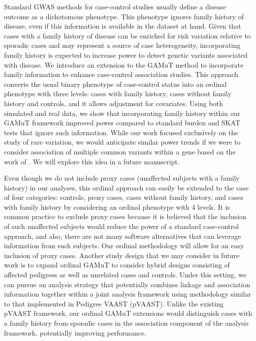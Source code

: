\documentclass[]{article}
\begin{document}
Standard GWAS methods for case-control studies usually define a disease outcome as a dichotomous phenotype. This phenotype ignores family history of disease, even if this information is available in the dataset at hand. Given that cases with a family history of disease can be enriched for risk variation relative to sporadic cases and may represent a source of case heterogeneity, incorporating family history is expected to increase power to detect genetic variants associated with disease. We introduce an extension to the GAMuT method \citep{Broadaway2016} to incorporate family information to enhance case-control association studies. This approach converts the usual binary phenotype of case-control status into an ordinal phenotype with three levels: cases with family history, cases without family history and controls, and it allows adjustment for covariates. Using both simulated and real data, we show that incorporating family history within our GAMuT framework improved power compared to standard burden and SKAT tests that ignore such information. While our work focused exclusively on the study of rare variation, we would anticipate similar power trends if we were to consider association of multiple common variants within a gene based on the work of \citet{TengRisch1999}. We will explore this idea in a future manuscript.

Even though we do not include proxy cases (unaffected subjects with a family history) in our analyses, this ordinal approach can easily be extended to the case of four categories: controls, proxy cases, cases without family history, and cases with family history by considering an ordinal phenotype with 4 levels. It is common practice to exclude proxy cases because it is believed that the inclusion of such unaffected subjects would reduce the power of a standard case-control approach, and also, there are not many software alternatives that can leverage information from such subjects. Our ordinal methodology will allow for an easy inclusion of proxy cases. Another study design that we may consider in future work is to expand ordinal GAMuT to consider hybrid designs consisting of affected pedigrees as well as unrelated cases and controls. Under this setting, we can pursue an analysis strategy that potentially combines linkage and association information together within a joint analysis framework using methodology similar to that implemented in Pedigree VAAST (pVAAST)\citep{Hu2014}. Unlike the existing pVAAST framework, our ordinal GAMuT extensions would distinguish cases with a family history from sporadic cases in the association component of the analysis framework, potentially improving performance.
\end{document}
